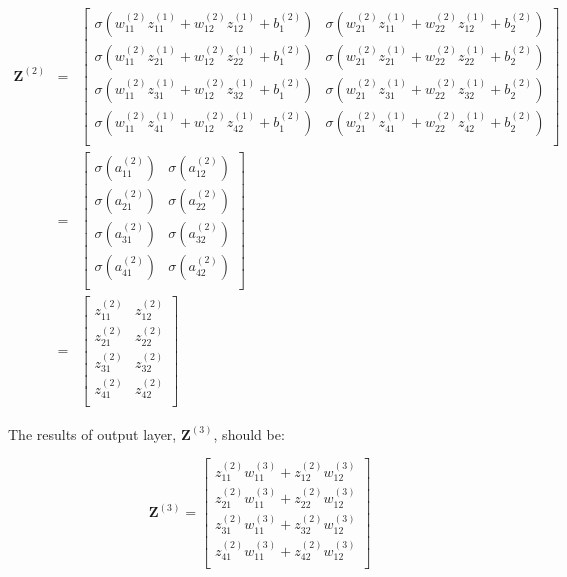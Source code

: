 \documentclass{article}
\begin{document}
\begin{eqnarray}
\mathbf{Z}^{(2)} 
& = & \left[\begin{array}{ccc}
	\sigma(w^{(2)}_{11}z^{(1)}_{11} + w^{(2)}_{12}z^{(1)}_{12} + b^{(2)}_1) &
	\sigma(w^{(2)}_{21}z^{(1)}_{11} + w^{(2)}_{22}z^{(1)}_{12} + b^{(2)}_2) \\
	\sigma(w^{(2)}_{11}z^{(1)}_{21} + w^{(2)}_{12}z^{(1)}_{22} + b^{(2)}_1) &
	\sigma(w^{(2)}_{21}z^{(1)}_{21} + w^{(2)}_{22}z^{(1)}_{22} + b^{(2)}_2) \\
	\sigma(w^{(2)}_{11}z^{(1)}_{31} + w^{(2)}_{12}z^{(1)}_{32} + b^{(2)}_1) &
	\sigma(w^{(2)}_{21}z^{(1)}_{31} + w^{(2)}_{22}z^{(1)}_{32} + b^{(2)}_2) \\
	\sigma(w^{(2)}_{11}z^{(1)}_{41} + w^{(2)}_{12}z^{(1)}_{42} + b^{(2)}_1) &
	\sigma(w^{(2)}_{21}z^{(1)}_{41} + w^{(2)}_{22}z^{(1)}_{42} + b^{(2)}_2) \\
\end{array}
\right] \nonumber \\
& = & \left[\begin{array}{ccc}	
	\sigma(a^{(2)}_{11}) & \sigma(a^{(2)}_{12}) \\
	\sigma(a^{(2)}_{21}) & \sigma(a^{(2)}_{22}) \\
	\sigma(a^{(2)}_{31}) & \sigma(a^{(2)}_{32}) \\
	\sigma(a^{(2)}_{41}) & \sigma(a^{(2)}_{42}) \\
\end{array}
\right] \nonumber \\
& = & \left[\begin{array}{ccc}	
	z^{(2)}_{11} & z^{(2)}_{12} \\
	z^{(2)}_{21} & z^{(2)}_{22} \\
	z^{(2)}_{31} & z^{(2)}_{32} \\
	z^{(2)}_{41} & z^{(2)}_{42} \\
\end{array}
\right]
\end{eqnarray}

\noindent The results of output layer, $\mathbf{Z}^{(3)}$, should be:

\begin{equation}
\mathbf{Z}^{(3)} = \left[\begin{array}{c}
	z^{(2)}_{11}w^{(3)}_{11} + z^{(2)}_{12}w^{(3)}_{12} \\
	z^{(2)}_{21}w^{(3)}_{11} + z^{(2)}_{22}w^{(3)}_{12} \\
	z^{(2)}_{31}w^{(3)}_{11} + z^{(2)}_{32}w^{(3)}_{12} \\
	z^{(2)}_{41}w^{(3)}_{11} + z^{(2)}_{42}w^{(3)}_{12} \\
\end{array}
\right]
\end{equation}
\end{document}
